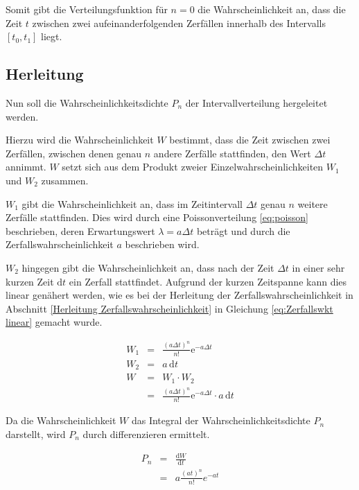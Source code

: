 \documentclass[12pt,a4paper]{scrartcl}
\numberwithin{equation}{section} %
\renewcommand{\[}{} %
\renewcommand{\]}{\noindent} %
\begin{document}
Somit gibt die Verteilungsfunktion für $n=0$ die Wahrscheinlichkeit an, dass die Zeit $t$ zwischen zwei aufeinanderfolgenden Zerfällen innerhalb des Intervalls $[t_0, t_1]$ liegt.

\hypertarget{Herleitung Intervallverteilung}{\subsection{Herleitung}\label{Herleitung Intervallverteilung}}
Nun soll die Wahrscheinlichkeitsdichte $P_n$ der Intervallverteilung hergeleitet werden.

Hierzu wird die Wahrscheinlichkeit $W$ bestimmt, dass die Zeit zwischen zwei Zerfällen, zwischen denen genau $n$ andere Zerfälle stattfinden, den Wert $\Delta t$ annimmt. $W$ setzt sich aus dem Produkt zweier Einzelwahrscheinlichkeiten $W_1$ und $W_2$ zusammen.

$W_1$ gibt die Wahrscheinlichkeit an, dass im Zeitintervall $\Delta t$ genau $n$ weitere Zerfälle stattfinden. Dies wird durch eine Poissonverteilung \eqref{eq:poisson} beschrieben, deren Erwartungswert $\lambda = a\Delta t$ beträgt und durch die Zerfallswahrscheinlichkeit $a$ beschrieben wird.

$W_2$ hingegen gibt die Wahrscheinlichkeit an, dass nach der Zeit $\Delta t$ in einer sehr kurzen Zeit $\mathrm dt$ ein Zerfall stattfindet. Aufgrund der kurzen Zeitspanne kann dies linear genähert werden, wie es bei der Herleitung der Zerfallswahrscheinlichkeit in Abschnitt \ref{Herleitung Zerfallswahrscheinlichkeit}  in Gleichung \eqref{eq:Zerfallswkt linear} gemacht wurde.

\begin{eqnarray}
	W_1 &=& \frac{(a\Delta t)^n}{n!} \mathrm{e}^{-a\Delta t} \\
	W_2 &=& a \,\mathrm dt \\
	W &=& W_1 \cdot W_2 \\
		&=& \frac{\left(a\Delta t\right)^n}{n!}  \mathrm{e}^{-a\Delta t} \cdot a \,\mathrm dt
\end{eqnarray}

\noindent
Da die Wahrscheinlichkeit $W$ das Integral der Wahrscheinlichkeitsdichte $P_n$ darstellt, wird $P_n$ durch differenzieren ermittelt.

\begin{eqnarray}
	P_n &=& \frac{\mathrm dW}{\mathrm dt} \\
		&=& a \frac{\left(at\right)^n}{n!} e^{-at}
\end{eqnarray}
\end{document}
